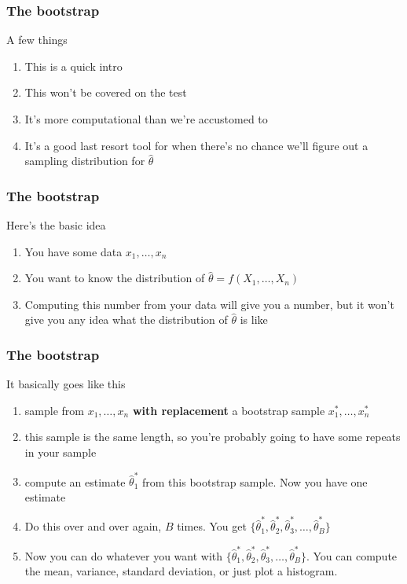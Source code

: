 \documentclass{beamer}
\begin{document}

\begin{frame}
\frametitle{The bootstrap}

A few things
\begin{enumerate}
\item This is a quick intro
\item This won't be covered on the test
\item It's more computational than we're accustomed to
\item It's a good last resort tool for when there's no chance we'll figure out a sampling distribution for $\hat{\theta}$
\end{enumerate}

\end{frame}


\begin{frame}
\frametitle{The bootstrap}

Here's the basic idea
\begin{enumerate}
\item You have some data $x_1, \ldots, x_n$
\item You want to know the distribution of $\hat{\theta} = f(X_1, \ldots, X_n)$
\item Computing this number from your data will give you a number, but it won't give you any idea what the distribution of $\hat{\theta}$ is like
\end{enumerate}


\end{frame}

\begin{frame}
\frametitle{The bootstrap}


It basically goes like this
\begin{enumerate}
\item sample from $x_1, \ldots, x_n$ {\bf with replacement} a bootstrap sample $x^*_1, \ldots, x_n^*$
\item this sample is the same length, so you're probably going to have some repeats in your sample
\item compute an estimate $\hat{\theta}_1^*$ from this bootstrap sample. Now you have one estimate
\item Do this over and over again, $B$ times. You get $\{\hat{\theta}_1^*, \hat{\theta}_2^*, \hat{\theta}_3^*, \ldots, \hat{\theta}_B^*\}$
\item Now you can do whatever you want with $\{\hat{\theta}_1^*, \hat{\theta}_2^*, \hat{\theta}_3^*, \ldots, \hat{\theta}_B^*\}$. You can compute the mean, variance, standard deviation, or just plot a histogram.
\end{enumerate}

\end{frame}

\end{document}
